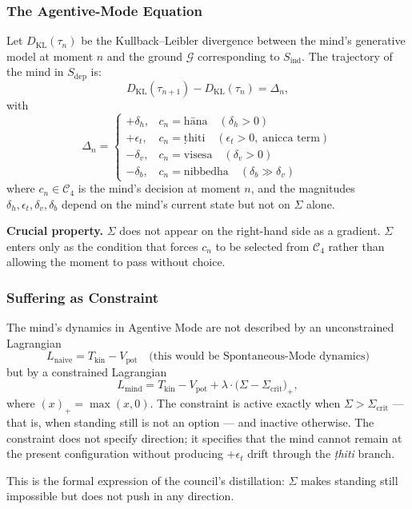 \documentclass[12pt, a4paper]{article}
\begin{document}
\subsubsection{The Agentive-Mode Equation}

\begin{formalbox}[title={EQ-MB01: Decision-Driven Trajectory}]
Let $D_{\mathrm{KL}}(\tau_n)$ be the Kullback--Leibler divergence
between the mind's generative model at moment $n$ and the ground
$\mathcal{G}$ corresponding to $S_{\mathrm{ind}}$. The trajectory of
the mind in $S_{\mathrm{dep}}$ is:
\[
  D_{\mathrm{KL}}(\tau_{n+1}) - D_{\mathrm{KL}}(\tau_n) = \Delta_n,
\]
with
\[
  \Delta_n =
  \begin{cases}
    +\delta_h, & c_n = \text{hāna} \quad (\delta_h > 0) \\
    +\epsilon_t, & c_n = \text{ṭhiti} \quad (\epsilon_t > 0,\; \text{anicca term}) \\
    -\delta_v, & c_n = \text{visesa} \quad (\delta_v > 0) \\
    -\delta_b, & c_n = \text{nibbedha} \quad (\delta_b \gg \delta_v)
  \end{cases}
\]
where $c_n \in \mathcal{C}_4$ is the mind's decision at moment $n$,
and the magnitudes $\delta_h, \epsilon_t, \delta_v, \delta_b$ depend
on the mind's current state but not on $\Sigma$ alone.

\textbf{Crucial property.} $\Sigma$ does not appear on the right-hand
side as a gradient. $\Sigma$ enters only as the condition that forces
$c_n$ to be selected from $\mathcal{C}_4$ rather than allowing the
moment to pass without choice.
\end{formalbox}

\subsubsection{Suffering as Constraint}

\begin{formalbox}[title={EQ-MB02: $\Sigma$ as Lagrange Constraint}]
The mind's dynamics in Agentive Mode are not described by an
unconstrained Lagrangian
\[
  L_{\mathrm{naive}} = T_{\mathrm{kin}} - V_{\mathrm{pot}}
  \quad \text{(this would be Spontaneous-Mode dynamics)}
\]
but by a constrained Lagrangian
\[
  L_{\mathrm{mind}} = T_{\mathrm{kin}} - V_{\mathrm{pot}} +
  \lambda \cdot \big(\Sigma - \Sigma_{\mathrm{crit}}\big)_+,
\]
where $(x)_+ = \max(x, 0)$. The constraint is active exactly when
$\Sigma > \Sigma_{\mathrm{crit}}$ --- that is, when standing still is
not an option --- and inactive otherwise. The constraint does not
specify direction; it specifies that the mind cannot remain at the
present configuration without producing $+\epsilon_t$ drift through
the \emph{ṭhiti} branch.

This is the formal expression of the council's distillation: $\Sigma$
makes standing still impossible but does not push in any direction.
\end{formalbox}
\end{document}
